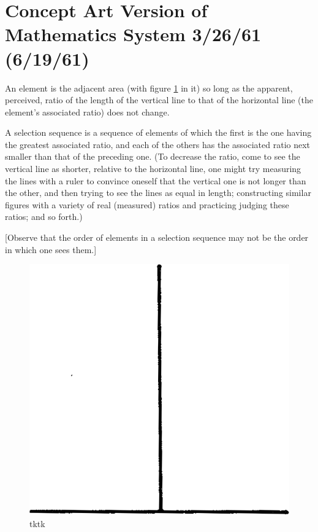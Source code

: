 \section{Concept Art Version of Mathematics System 3/26/61 (6/19/61)}

An element is the adjacent area (with figure \ref{implications} in it) so long as the 
apparent, perceived, ratio of the length of the vertical line to that of the 
horizontal line (the element's associated ratio) does not change. 

A selection sequence is a sequence of elements of which the first is the one 
having the greatest associated ratio, and each of the others has the associated 
ratio next smaller than that of the preceding one. (To decrease the ratio, 
come to see the vertical line as shorter, relative to the horizontal line, one 
might try measuring the lines with a ruler to convince oneself that the 
vertical one is not longer than the other, and then trying to see the lines as 
equal in length; constructing similar figures with a variety of real (measured) 
ratios and practicing judging these ratios; and so forth.) 

[Observe that the order of elements in a selection sequence may not be the 
order in which one sees them.] 

\begin{figure}
	\centering
	\includegraphics[scale=1]{img/implications}
	\caption{tktk}
	\label{implications}
\end{figure}

